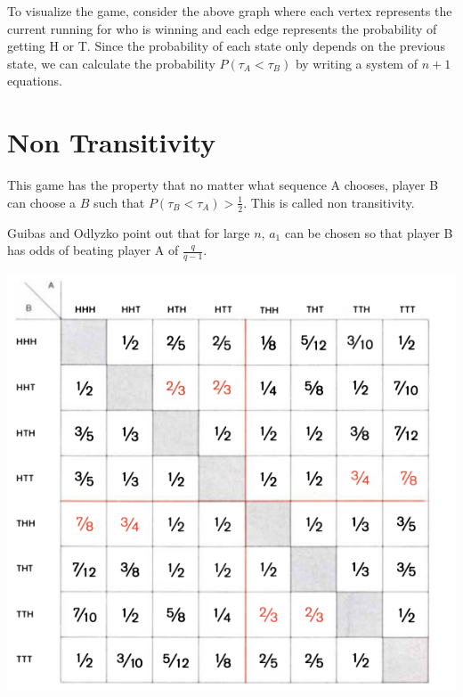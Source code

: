 \documentclass[12pt,haverford,landscape]{haverposter}
\begin{document}
\begin{multicols}{4}
To visualize the game, consider the above graph where each vertex represents the current running
for who is winning and each edge represents the probability of getting H or T. Since the probability 
of each state only depends on the previous state, we can calculate the probability $P(\tau_A < \tau_B)$
by writing a system of $n+1$ equations. 


\color{Black} %

\section{\LARGE Non Transitivity}

This game has the property that no matter what sequence A chooses, player B can choose
a $B$ such that $P(\tau_B < \tau_A) > \frac{1}{2}$. This is called non transitivity.

Guibas and Odlyzko point out that for large $n$, $a_1$ can be chosen so that
player B has odds of beating player A of $\frac{q}{q-1}$. \cite{guibas} \\

\begin{center}
\includegraphics[width=.8\linewidth]{nonTransitivityTable.png}
\end{center}


\end{multicols}
\end{document}
